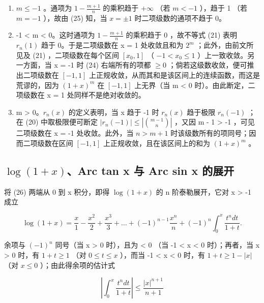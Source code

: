 \begin{enumerate}
\def\labelenumi{\alph{enumi})}
\item
  \(m \leqslant -1\) 。通项为 \(1 - \frac{m + 1}{n}\) 的乘积趋于 \(+\infty\) （若 \(m < -1\) ），趋于 1 （若 \(m = -1\) ），故由 (25) 知，当 \(x = \pm 1\) 时二项级数的通项不趋于 0。
\item
  -1 \textless{} m \textless{} 0。这时通项为 \(1 - \frac{m + 1}{n}\) 的乘积趋于 0 ，故不等式 (21) 表明 \(r_{n}(1)\) 趋于 0。于是二项级数在 x = 1 处收敛且和为 \(2^{m}\) ；此外，由前文所见及 (21) ，二项级数在每个区间 \([x_{0}, 1]\) （ \(-1 < x_{0} \leqslant 1\) ）上一致收敛。另一方面，当 x = -1 时 (24) 右端所有的项都 \(\geqslant 0\) ；倘若这级数收敛，便可推出二项级数在 \([-1, 1]\) 上正规收敛，从而其和是该区间上的连续函数，而这是荒谬的，因为 \((1 + x)^{m}\) 在 \([-1, 1]\) 上无界（当 m \textless{} 0 时）。由此断定，二项级数在 x = 1 处同样不是绝对收敛的。
\item
  m \textgreater{} 0。\(r_{n}(x)\) 的定义表明，当 x 趋于 -1 时 \(r_{n}(x)\) 趋于极限 \(r_{n}(-1)\) ；在 (20) 中取极限便可断定 \(|r_{n}(-1)| \leqslant \left|\binom{m-1}{n}\right|\) ，又因 m - 1 \textgreater{} -1 ，可见二项级数在 x = -1 处收敛。此外，当 \(n > m + 1\) 时该级数所有的项同号；因而二项级数在区间 \([-1, 1]\) 上正规收敛，且在该区间上的和为 \((1 + x)^{m}\) 。
\end{enumerate}

\subsection{\texorpdfstring{\(\log(1 + x)\)、Arc tan x 与 Arc sin x 的展开}{log(1 + x)、Arc tan x 与 Arc sin x 的展开}}

将 (26) 两端从 0 到 x 积分，即得 \(\log(1 + x)\) 的 n 阶泰勒展开，它对 x \textgreater{} -1 成立

\[
\log (1 + x) = \frac {x}{1} - \frac {x ^ {2}}{2} + \frac {x ^ {3}}{3} + \dots + (- 1) ^ {n - 1} \frac {x ^ {n}}{n} + (- 1) ^ {n} \int_ {0} ^ {x} \frac {t ^ {n} d t}{1 + t}.\tag{27}
\]

余项与 \((-1)^{n}\) 同号（当 x \textgreater{} 0 时），且为 \textless{} 0 （当 -1 \textless{} x \textless{} 0 时）；再者，当 x \textgreater{} 0 时，有 \(1 + t \geqslant 1\) （对 \(0 \leqslant t \leqslant x\) ），而当 -1 \textless{} x \textless{} 0 时，有 \(1 + t \geqslant 1 - |x|\) （对 \(x \leqslant 0\) ）；由此得余项的估计式

\[
\left| \int_ {0} ^ {x} \frac {t ^ {n} d t}{1 + t} \right| \leqslant \frac {| x | ^ {n + 1}}{n + 1}
\]

